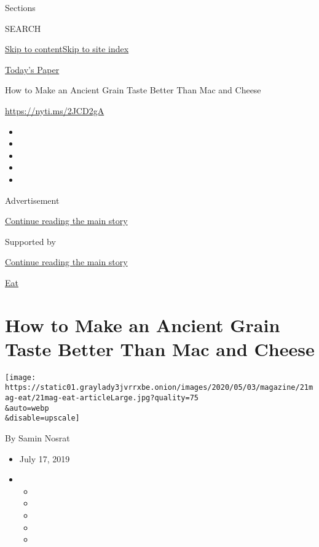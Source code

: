Sections

SEARCH

\protect\hyperlink{site-content}{Skip to
content}\protect\hyperlink{site-index}{Skip to site index}

\href{https://myaccount.nytimes3xbfgragh.onion/auth/login?response_type=cookie\&client_id=vi}{}

\href{https://www.nytimes3xbfgragh.onion/section/todayspaper}{Today's
Paper}

How to Make an Ancient Grain Taste Better Than Mac and Cheese

\url{https://nyti.ms/2JCD2gA}

\begin{itemize}
\item
\item
\item
\item
\item
\end{itemize}

Advertisement

\protect\hyperlink{after-top}{Continue reading the main story}

Supported by

\protect\hyperlink{after-sponsor}{Continue reading the main story}

\href{/column/magazine-eat}{Eat}

\hypertarget{how-to-make-an-ancient-grain-taste-better-than-mac-and-cheese}{%
\section{How to Make an Ancient Grain Taste Better Than Mac and
Cheese}\label{how-to-make-an-ancient-grain-taste-better-than-mac-and-cheese}}

\texttt{[image: https://static01.graylady3jvrrxbe.onion/images/2020/05/03/magazine/21mag-eat/21mag-eat-articleLarge.jpg?quality=75\\\&auto=webp\\\&disable=upscale]}

By Samin Nosrat

\begin{itemize}
\item
  July 17, 2019
\item
  \begin{itemize}
  \item
  \item
  \item
  \item
  \item
  \end{itemize}
\end{itemize}

